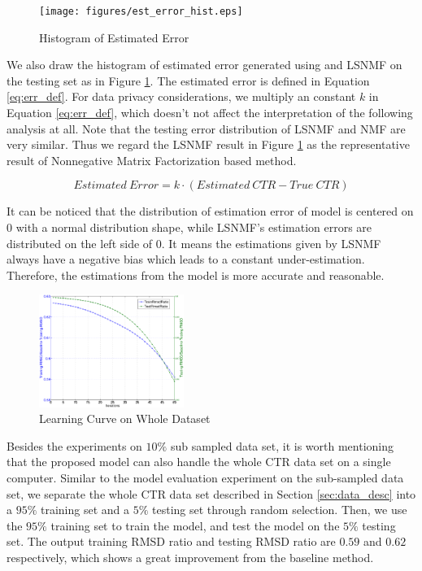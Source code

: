 \begin{figure}[!ht]
  \centering
  \texttt{[image: figures/est\_error\_hist.eps]}
  \caption{Histogram of Estimated Error}
  \label{fig:est_err}
\end{figure}

We also draw the histogram of estimated error generated using {\sppan}
and LSNMF on the testing set as in Figure \ref{fig:est_err}. The
estimated error is defined in Equation \ref{eq:err_def}. For data
privacy considerations, we multiply an constant $k$ in Equation
\ref{eq:err_def}, which doesn't not affect the interpretation of the
following analysis at all. Note that the testing error distribution of
LSNMF and NMF are very similar. Thus we regard the LSNMF result in
Figure \ref{fig:est_err} as the representative result of Nonnegative
Matrix Factorization based method.

\begin{equation}
\label{eq:err_def}
Estimated~Error=k\cdot(Estimated~CTR - True~CTR)
\end{equation}

It can be noticed that the distribution of estimation error of {\sppan}
model is centered on 0 with a normal distribution shape, while LSNMF's
estimation errors are distributed on the left side of 0. It means the
estimations given by LSNMF always have a negative bias which leads to
a constant under-estimation. Therefore, the estimations from the {\sppan}
model is more accurate and reasonable.

\begin{figure}[!ht]
  \centering
  \includegraphics[width=0.42\textwidth]{figures/learning_curve_sppan_whole_relative.eps}
  \caption{{\sppan} Learning Curve on Whole Dataset}
  \label{fig:sppan_curve_whole}
\end{figure}

Besides the experiments on $10\%$ sub sampled data set, it is worth
mentioning that the proposed {\sppan} model can also handle the whole
CTR data set on a single computer. Similar to the model evaluation
experiment on the sub-sampled data set, we separate the whole CTR data
set described in Section \ref{sec:data_desc} into a $95\%$ training
set and a $5\%$ testing set through random selection. Then, we use the
$95\%$ training set to train the {\sppan} model, and test the model on
the $5\%$ testing set. The output training RMSD ratio and testing RMSD
ratio are $0.59$ and $0.62$ respectively, which shows a great
improvement from the baseline method.

